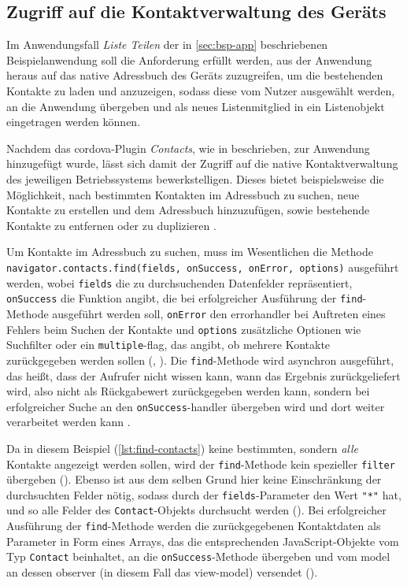 		
\subsection{Zugriff auf die Kontaktverwaltung des Geräts} \label{sec:contacts}

Im Anwendungsfall \emph{Liste Teilen} der in \autoref{sec:bsp-app} beschriebenen Beispielanwendung  soll die Anforderung erfüllt werden, aus der Anwendung heraus auf das native Adressbuch des Geräts zuzugreifen, um die bestehenden Kontakte zu laden und anzuzeigen, sodass diese vom Nutzer ausgewählt werden, an die Anwendung übergeben und als neues Listenmitglied in ein Listenobjekt eingetragen werden können.

Nachdem das \gls{cordova}-Plugin \emph{Contacts}, wie in  beschrieben, zur Anwendung hinzugefügt wurde, lässt sich damit der Zugriff auf die native Kontaktverwaltung des jeweiligen Betriebssystems bewerkstelligen.
Dieses bietet beispielsweise die Möglichkeit, nach bestimmten Kontakten im Adressbuch zu suchen, neue Kontakte zu erstellen und dem Adressbuch hinzuzufügen, sowie bestehende Kontakte zu entfernen oder zu duplizieren \cite{Cordova_Plugin_Registry_Contacts}.

Um Kontakte im Adressbuch zu suchen, muss im Wesentlichen die Methode \lstinline|navigator.contacts.find(fields, onSuccess, onError, options)| ausgeführt werden, wobei \lstinline|fields| die zu durchsuchenden Datenfelder repräsentiert, \lstinline|onSuccess| die Funktion angibt, die bei erfolgreicher Ausführung der \lstinline|find|-Methode ausgeführt werden soll, \lstinline|onError| den \gls{errorhandler} bei Auftreten eines Fehlers beim Suchen der Kontakte und \lstinline|options| zusätzliche Optionen wie Suchfilter oder ein \lstinline|multiple|-\gls{flag}, das angibt, ob mehrere Kontakte zurückgegeben werden sollen (, ).
Die \lstinline|find|-Methode wird \gls{asynchron} ausgeführt, das heißt, dass der Aufrufer nicht wissen kann, wann das Ergebnis zurückgeliefert wird, also nicht als Rückgabewert zurückgegeben werden kann, sondern bei erfolgreicher Suche an den \og \lstinline|onSuccess|-\gls{handler} übergeben wird und dort weiter verarbeitet werden kann \cite{Cordova_Plugin_Registry_Contacts}.

Da in diesem Beispiel (\autoref{lst:find-contacts}) keine bestimmten, sondern \emph{alle} Kontakte angezeigt werden sollen, wird der \lstinline|find|-Methode kein spezieller \lstinline|filter| übergeben (). 
Ebenso ist aus dem selben Grund hier keine Einschränkung der durchsuchten Felder nötig, sodass durch der \lstinline|fields|-Parameter den Wert \lstinline|"*"| hat, und so alle Felder des \lstinline|Contact|-Objekts durchsucht werden ().
Bei erfolgreicher Ausführung der \lstinline|find|-Methode werden die zurückgegebenen Kontaktdaten als Parameter in Form eines Arrays, das die entsprechenden JavaScript-Objekte vom Typ \lstinline|Contact| beinhaltet, an die \lstinline|onSuccess|-Methode übergeben und vom \gls{model} an dessen \gls{observer} (in diesem Fall das \gls{view-model}) versendet (). 

